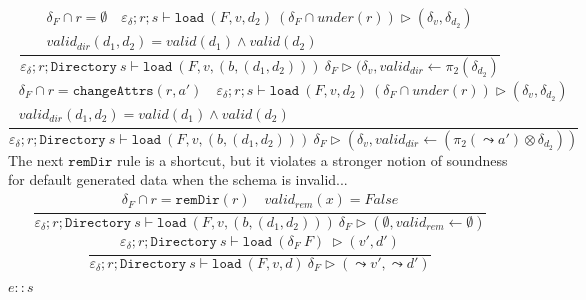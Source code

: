 \documentclass{report}
\theoremstyle{theorem}
\begin{document}
\begin{displaymath}
	\frac{\begin{array}{c}
		\delta_F \cap r = \emptyset \quad
		\varepsilon_\delta ; r ; s \vdash \mathtt{load}~ (F,v,d_2)~ (\delta_F \cap under(r)) \rhd (\delta_v,\delta_{d_2})\\
		valid_{dir}(d_1,d_2) = valid(d_1) \wedge valid (d_2)
	\end{array}}
	{\varepsilon_\delta ; r ; \mathtt{Directory}~s \vdash \mathtt{load}~ (F,v,(b,(d_1,d_2)))~ \delta_F \rhd (\delta_v,valid_{dir} \leftarrow \pi_2(\delta_{d_2})}
\end{displaymath}
\begin{displaymath}
	\frac{\begin{array}{c}
		\delta_F \cap r = \mathtt{changeAttrs}(r,a') \quad
		\varepsilon_\delta ; r ; s \vdash \mathtt{load}~ (F,v,d_2)~ (\delta_F \cap under(r)) \rhd (\delta_v,\delta_{d_2})\\
		valid_{dir}(d_1,d_2) = valid(d_1) \wedge valid (d_2)
	\end{array}}
	{\varepsilon_\delta ; r ; \mathtt{Directory}~s \vdash \mathtt{load}~ (F,v,(b,(d_1,d_2)))~ \delta_F \rhd (\delta_v,valid_{dir} \leftarrow (\pi_2(\leadsto a') \otimes \delta_{d_2}))}
\end{displaymath}
The next $\mathtt{remDir}$ rule is a shortcut, but it violates a stronger notion of soundness for default generated data when the schema is invalid...
\begin{displaymath}
	\frac{\begin{array}{c}
		\delta_F \cap r = \mathtt{remDir}(r) \quad valid_{rem}(x) = False
	\end{array}}
	{\varepsilon_\delta ; r ; \mathtt{Directory}~s \vdash \mathtt{load}~ (F,v,(b,(d_1,d_2)))~ \delta_F \rhd (\emptyset,valid_{rem} \leftarrow \emptyset)}
\end{displaymath}
\begin{displaymath}
	\frac{\begin{array}{c}
		\varepsilon_\delta ; r ; \mathtt{Directory}~s \vdash \mathtt{load}~ (\delta_F~ F)~  \rhd (v',d')
	\end{array}}
	{\varepsilon_\delta ; r ; \mathtt{Directory}~s \vdash \mathtt{load}~ (F,v,d)~ \delta_F \rhd (\leadsto v',\leadsto d')}
\end{displaymath}

$\boxed{e :: s}$
\end{document}
